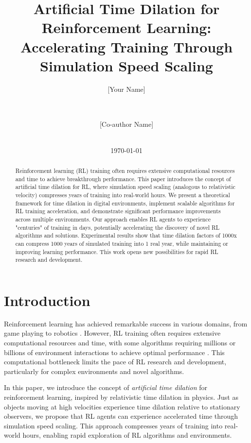 \documentclass[11pt,twocolumn]{article}
\title{Artificial Time Dilation for Reinforcement Learning: Accelerating Training Through Simulation Speed Scaling}
\author{
    [Your Name] \\
    [Your Affiliation] \\
    [Your Email] \\
    \and
    [Co-author Name] \\
    [Co-author Affiliation] \\
    [Co-author Email]
}
\date{\today}
\begin{document}
\maketitle

\begin{abstract}
Reinforcement learning (RL) training often requires extensive computational resources and time to achieve breakthrough performance. This paper introduces the concept of artificial time dilation for RL, where simulation speed scaling (analogous to relativistic velocity) compresses years of training into real-world hours. We present a theoretical framework for time dilation in digital environments, implement scalable algorithms for RL training acceleration, and demonstrate significant performance improvements across multiple environments. Our approach enables RL agents to experience "centuries" of training in days, potentially accelerating the discovery of novel RL algorithms and solutions. Experimental results show that time dilation factors of 1000x can compress 1000 years of simulated training into 1 real year, while maintaining or improving learning performance. This work opens new possibilities for rapid RL research and development.
\end{abstract}

\section{Introduction}

Reinforcement learning has achieved remarkable success in various domains, from game playing \cite{mnih2015human} to robotics \cite{levine2016end}. However, RL training often requires extensive computational resources and time, with some algorithms requiring millions or billions of environment interactions to achieve optimal performance \cite{schulman2017proximal}. This computational bottleneck limits the pace of RL research and development, particularly for complex environments and novel algorithms.

In this paper, we introduce the concept of \emph{artificial time dilation} for reinforcement learning, inspired by relativistic time dilation in physics. Just as objects moving at high velocities experience time dilation relative to stationary observers, we propose that RL agents can experience accelerated time through simulation speed scaling. This approach compresses years of training into real-world hours, enabling rapid exploration of RL algorithms and environments.
\end{document}

